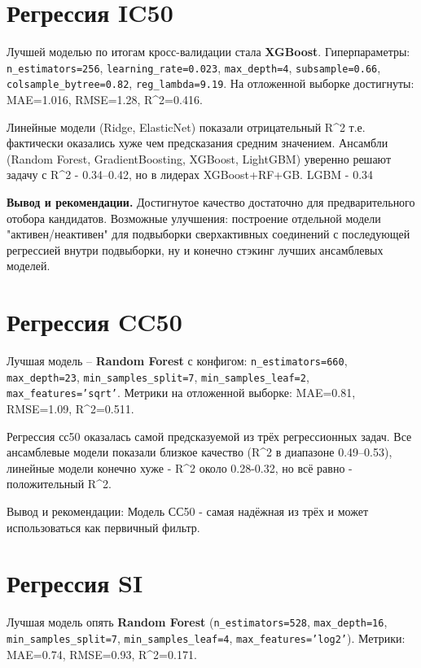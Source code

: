 \documentclass[12pt,a4paper]{report}
\begin{document}
\section{Регрессия IC50}

Лучшей моделью по итогам кросс-валидации стала \textbf{XGBoost}. Гиперпараметры: \texttt{n\_estimators=256}, \texttt{learning\_rate=0.023}, \texttt{max\_depth=4}, \texttt{subsample=0.66}, \texttt{colsample\_bytree=0.82}, \texttt{reg\_lambda=9.19}. На отложенной выборке достигнуты: MAE=1.016, RMSE=1.28, R\^{}2=0.416.   

Линейные модели (Ridge, ElasticNet) показали отрицательный R\^{}2  т.е. фактически оказались хуже чем предсказания средним значением.  Ансамбли (Random Forest, GradientBoosting, XGBoost, LightGBM) уверенно решают задачу с R\^{}2 - 0.34--0.42, но в лидерах XGBoost+RF+GB. LGBM - 0.34

\textbf{Вывод и рекомендации.} Достигнутое качество достаточно для предварительного отобора кандидатов. Возможные улучшения: построение отдельной модели "активен/неактивен" для подвыборки сверхактивных соединений с последующей регрессией внутри подвыборки, ну и конечно стэкинг лучших ансамблевых моделей.

\section{Регрессия CC50}

Лучшая модель -- \textbf{Random Forest} с конфигом: \texttt{n\_estimators=660}, \texttt{max\_depth=23}, \texttt{min\_samples\_split=7}, \texttt{min\_samples\_leaf=2}, \texttt{max\_features='sqrt'}. Метрики на отложенной выборке: MAE=0.81, RMSE=1.09, R\^{}2=0.511.

Регрессия сс50 оказалась самой предсказуемой из трёх регрессионных задач. Все ансамблевые модели показали близкое качество (R\^{}2 в диапазоне 0.49--0.53), линейные модели конечно хуже - R\^{}2 около 0.28-0.32, но всё равно - положительный R\^{}2. 

Вывод и рекомендации: Модель СС50 - самая надёжная из трёх и может использоваться как первичный фильтр.

\section{Регрессия SI}

Лучшая модель опять \textbf{Random Forest} (\texttt{n\_estimators=528}, \texttt{max\_depth=16}, \texttt{min\_samples\_split=7}, \texttt{min\_samples\_leaf=4}, \texttt{max\_features='log2'}). Метрики: MAE=0.74, RMSE=0.93, R\^{}2=0.171.
\end{document}
